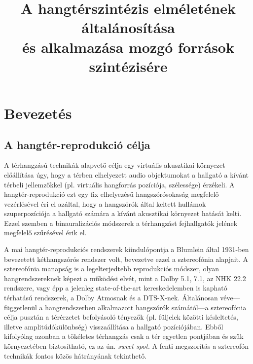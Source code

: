 \documentclass[10pt,twoside]{article}
\author{\theauthor}
\title{A hangtérszintézis elméletének általánosítása\\[.5ex]és alkalmazása mozgó források szintézisére}
\theoremstyle{thesisgroupstyle}
\theoremstyle{indented}
\begin{document}
\sloppy
\newcommand{\schoolname}{Budapesti Műszaki és Gazdaságtudományi Egyetem}
\newcommand{\facultyname}{Villamosmérnöki és Informatikai Kar}
\newcommand{\doctoralname}{Villamosmérnöki Tudományok Doktori Iskola}
\newcommand{\bookname}{PhD tézisfüzet}
\newcommand{\authorname}{Author}
\newcommand{\supervisorname}{Konzulens:}
\newcommand{\supervisor}{Dr. Fiala Péter}
\newcommand{\creationdate}{Budapest, 2018.}
\def \deptlogo {logos/hit_logo_en.png}
\def \lablogo {logos/last_logo_eng.png}

\nonfrenchspacing


\thispagestyle{empty}
\cleardoublepage
\setcounter{page}{1}

\section{Bevezetés}

\subsection{A hangtér-reprodukció célja}
%
A térhangzású technikák alapvető célja egy virtuális akusztikai környezet előállítása úgy, hogy a térben elhelyezett audio objektumokat a hallgató a kívánt térbeli jellemzőkkel (pl. virtuális hangforrás pozíciója, szélessége) érzékeli.
A hangtér-reprodukció ezt egy fix elhelyezésű hangszórósokaság megfelelő vezérlésével éri el azáltal, hogy a hangszórók által keltett hullámok szuperpozíciója a hallgató számára a kívánt akusztikai környezet hatását kelti.
Ezzel szemben a binauralizációs módszerek a térhangzást fejhallgatók jelének megfelelő szűrésével érik el.

A mai hangtér-reprodukciós rendszerek kiindulópontja a Blumlein által 1931-ben bevezetett kéthangszórós rendszer volt, bevezetve ezzel a sztereofónia alapjait.
A sztereofónia manapság is a legelterjedtebb reprodukciós módszer, olyan hangrendszereknek képezi a működési elvét, mint a Dolby 5.1, 7.1, az NHK 22.2 rendszere, vagy épp a jelenleg state-of-the-art kereskedelemben is kapható térhatású rendszerek, a Dolby Atmosnak és a DTS-X-nek.
Általánosan véve---függetlenül a hangrendszerben alkalmazott hangszórók számától---a sztereofónia célja pusztán a térérzetet befolyásoló tényezők (pl. füljelek közötti késleltetés, illetve amplitúdókülönbség) visszaállítása a hallgató pozíciójában.
Ebből kifolyólag azonban a tökéletes térhangzás csak a tér egyetlen pontjában és szűk környezetében biztosítható, ez az ún. \emph{sweet spot}.
A fenti megszorítás a sztereofón technikák fontos közös hátrányának tekinthető.
\end{document}
